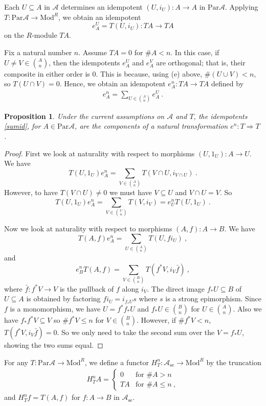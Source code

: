 \documentclass[a4paper,12pt,reqno]{amsart}
\newtheorem{proposition}[theorem]{Proposition}
\theoremstyle{definition}
\theoremstyle{fact}
\theoremstyle{genquest}
\theoremstyle{step}
\newcommand{\lra}{\longrightarrow}
\newcommand{\Lra}{\Longrightarrow}
\def\CA{{\mathscr A}}
\begin{document}
Each $U\subseteq A$ in $\CA$ determines an idempotent $(U,i_U):A\lra A$
in $\mathrm{Par}\CA$. 
Applying $T: \mathrm{Par}\CA \lra \mathrm{Mod}^R$, we obtain an idempotent
$$e_A^U = T(U,i_U): TA \lra TA$$
on the $R$-module $TA$.

Fix a natural number $n$.
Assume $TA=0$ for $\#A<n$. In this case, if $U\neq V \in \binom{A}{n}$, then the idempotents $e_A^U$ and $e_A^V$ are orthogonal; that is, their composite
in either order is $0$. 
This is because, using (e) above, $\#(U\cup V)< n$, so $T(U\cap V)=0$. 
Hence, we obtain an idempotent $e_A^n : TA \lra TA$ defined by
\begin{eqnarray}\label{sumid}
e_A^n = \sum_{U\in \binom{A}{n}}{e_A^U} \ .
\end{eqnarray}

\begin{proposition}
Under the current assumptions on $\CA$ and $T$, the idempotents
\eqref{sumid}, for $A\in \mathrm{Par}\CA$, are the components of a natural transformation $e^n : T \Lra T$. 
\end{proposition}
\begin{proof}
First we look at naturality with respect to morphisms $(U,1_U):A\lra U$.
We have
$$T(U,1_U) e_A^n = \sum_{V \in \binom{A}{n}}{T(V\cap U,i_{V\cap U})} \ .$$
However, to have $T(V\cap U)\neq 0$ we must have $V\subseteq U$ and
$V\cap U = V$. So
$$T(U,1_U) e_A^n = \sum_{V \in \binom{U}{n}}{T(V,i_{V})} = e_U^n T(U,1_U) \ .$$

Now we look at naturality with respect to morphisms $(A,f):A\lra B$. 
We have 
$$T(A,f)e_A^n = \sum_{U \in \binom{A}{n}}{T(U,fi_U)} \ ,$$
and
$$e_B^n T(A,f) = \sum_{V \in \binom{B}{n}}{T(f^*V,i_V\bar{f})} \ ,$$
where $\bar{f} :f^*V \lra V$ is the pullback of $f$ along $i_V$.
The direct image $f_*U\subseteq B$ of $U\subseteq A$ is obtained
by factoring $fi_U=i_{f_*U}s$ where $s$ is a strong epimorphism.
Since $f$ is a monomorphism, we have $U = f^*f_*U$ and $f_*U\in \binom{B}{n}$
for $U\in \binom{A}{n}$. Also we have $f_*f^*V\subseteq V$ so $\#f^*V\leq n$
for $V\in \binom{B}{n}$. However, if $\#f^*V< n$, $T(f^*V,i_V\bar{f})=0$.
So we only need to take the second sum over the $V=f_*U$, 
showing the two sums equal.    
\end{proof}

For any $T: \mathrm{Par}\CA \lra \mathrm{Mod}^R$, 
we define a functor $H^n_T:\CA_{\mathrm{se}}\lra \mathrm{Mod}^R$ by
the truncation
\begin{equation} 
\begin{aligned}
H^n_TA =
\begin{cases}
0 & \text{for }  \#A > n \\
TA & \text{for } \#A \leq n \ ,
\end{cases}
\end{aligned}
\end{equation}
and $H^n_Tf=T(A,f)$ for $f: A \lra B$ in $\CA_{\mathrm{se}}$.
\end{document}
